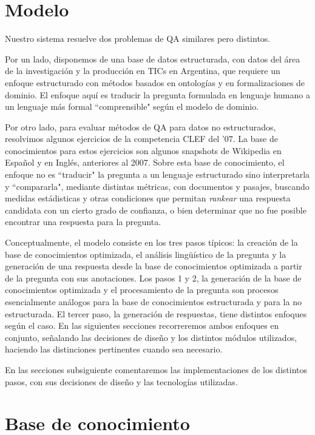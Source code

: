 \section{Modelo}

Nuestro sistema resuelve dos problemas de QA similares pero distintos. 

Por un lado, disponemos de una base de datos estructurada, con datos del área de la investigación y la
producción en TICs en Argentina, que requiere un enfoque estructurado con métodos basados en ontologías y en 
formalizaciones de dominio. El enfoque aquí es traducir la pregunta formulada en lenguaje humano a un lenguaje más
formal ``comprensible" según el modelo de dominio. 

Por otro lado, para evaluar métodos de QA 
para datos no estructurados, resolvimos algunos ejercicios de la competencia CLEF del '07. La base de conocimientos para
estos ejercicios son algunos snapshots de Wikipedia en Espa\~nol y en Inglés, anteriores al 2007. Sobre esta base de conocimiento,
el enfoque no es ``traducir" la pregunta a un lenguaje estructurado sino interpretarla y ``compararla", mediante distintas métricas, 
con documentos y pasajes, buscando medidas estádisticas y otras condiciones que permitan \textit{rankear} una respuesta candidata
con un cierto grado de confianza, o bien determinar que no fue posible encontrar una respuesta para la pregunta. 


Conceptualmente, el modelo consiste en los tres pasos típicos: la
creación de la base de conocimientos optimizada, el análisis
lingüístico de la pregunta y la generación de una respuesta desde
la base de conocimientos optimizada a partir de la pregunta con sus
anotaciones. 
Los pasos 1 y 2, la generación de la base de conocimientos optimizada y el procesamiento de la pregunta son procesos
esencialmente análogos para la base de conocimientos estructurada y para la no estructurada. El tercer paso, la generación de respuestas,
tiene distintos enfoques según el caso. 
En las siguientes secciones recorreremos ambos enfoques en conjunto, señalando las decisiones de dise\~no y los distintos módulos
utilizados, haciendo las distinciones pertinentes cuando sea necesario.

En las secciones subsiguiente comentaremos las implementaciones de los
distintos pasos, con sus decisiones de dise\~no y las tecnologías
utilizadas. 


\bigskip



\section{Base de conocimiento}
\bigskip


